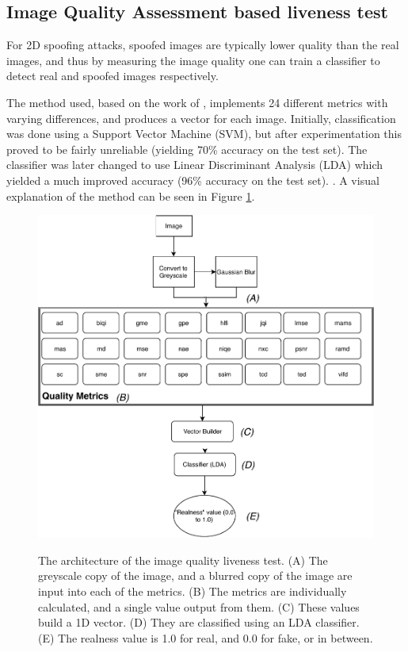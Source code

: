 \documentclass[10pt,a4paper]{article}
\begin{document}
    \subsection{Image Quality Assessment based liveness test}
        For 2D spoofing attacks, spoofed images are typically lower quality than the real images, and thus by measuring the image quality
        one can train a classifier to detect real and spoofed images respectively.

        The method used, based on the work of \citet{ImageQualityAssessmentTest}, implements 24 different metrics with varying differences, and produces
        a vector for each image. Initially, classification was done using a Support Vector Machine (SVM), but after experimentation this proved to be fairly
        unreliable (yielding 70\% accuracy on the test set). The classifier was later changed to use Linear Discriminant Analysis (LDA) which yielded a much improved
        accuracy (96\% accuracy on the test set). .
        A visual explanation of the method can be seen in Figure \ref{ImageQualityLivenessTestDiagram}. 


        \begin{figure}
            \centering
            \includegraphics[width=\linewidth]{ImageQualityLivenessTest.pdf}
            \label{ImageQualityLivenessTestDiagram}
            \caption{The architecture of the image quality liveness test. (A) The greyscale copy of the image, and a blurred copy of the image are input into each of the metrics.
            (B) The metrics are individually calculated, and a single value output from them. (C) These values build a 1D vector. (D) They are classified using an LDA classifier. (E) The realness value
            is 1.0 for real, and 0.0 for fake, or in between.}
        \end{figure}
\end{document}
